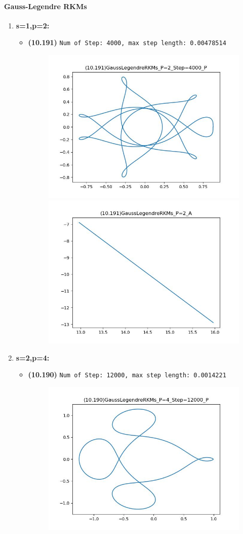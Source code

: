\documentclass{article}
\begin{document}
\newpage

\paragraph{Gauss-Legendre RKMs}

\begin{enumerate}
    \item \textbf{s=1,p=2:}
    \begin{itemize}
        \item \textbf{(10.191)} \verb|Num of Step: 4000, max step length: 0.00478514|
        \begin{figure}[h]
            \centering
            \includegraphics[width = 0.45\linewidth]{(10.191)GaussLegendreRKMs_P=2_Step=4000_P.jpg}
            \includegraphics[width = 0.45\linewidth]{(10.191)GaussLegendreRKMs_P=2_A.jpg}
        \end{figure}
    \end{itemize}
    \item \textbf{s=2,p=4:}
    \begin{itemize}
        \item \textbf{(10.190)} \verb|Num of Step: 12000, max step length: 0.0014221|
        \begin{figure}[h]
            \centering
            \includegraphics[width = 0.45\linewidth]{(10.190)GaussLegendreRKMs_P=4_Step=12000_P.jpg}

\end{figure}
\end{itemize}
\end{enumerate}
\end{document}
